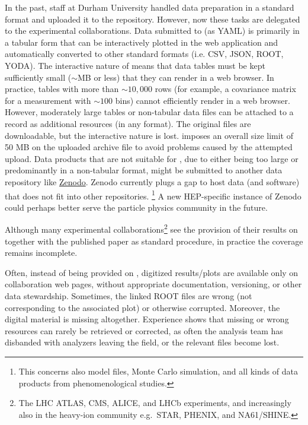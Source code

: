 \documentclass[11pt]{article}
\begin{document}
In the past, \hepdata staff at Durham University handled data preparation in a standard format and uploaded it to the repository.
However, now these tasks are delegated to the experimental collaborations.
Data submitted to \hepdata (as YAML) is primarily in a tabular form that can be interactively plotted in the web application and automatically converted to other standard formats (i.e. CSV, JSON, ROOT, YODA).
The interactive nature of \hepdata means that data tables must be kept sufficiently small ($\sim$MB or less) that they can render in a web browser.
In practice, tables with more than $\sim 10,000$ rows (for example, a covariance matrix for a measurement with $\sim 100$ bins) cannot efficiently render in a web browser.
However, moderately large tables or non-tabular data files can be attached to a \hepdata record as additional resources (in any format).
The original files are downloadable, but the interactive nature is lost.
\hepdata imposes an overall size limit of 50 MB on the uploaded archive file to avoid problems caused by the attempted upload. 
%
Data products that are not suitable for \hepdata, due to either being too large or predominantly in a non-tabular format, might be submitted to another data repository like \href{https://zenodo.org/}{Zenodo}.
Zenodo currently plugs a gap to host data (and software) that does not fit into other repositories.%
\footnote{This concerns also model files, Monte Carlo simulation, and all kinds of data products from phenomenological studies.}
A new HEP-specific instance of Zenodo could perhaps better serve the particle physics community in the future.


Although many experimental collaborations\footnote{The LHC ATLAS, CMS, ALICE, and LHCb experiments, and increasingly also in the heavy-ion community e.g.~STAR, PHENIX, and NA61/SHINE.} see the provision of their results on \hepdata together with the published paper as standard procedure, in practice the coverage remains incomplete.

Often, instead of being provided on \hepdata, digitized results/plots are available only on collaboration web pages, without appropriate documentation, versioning, or other data stewardship.
Sometimes, the linked ROOT files are wrong (not corresponding to the associated plot) or otherwise corrupted.
Moreover, the digital material is missing altogether.
Experience shows that missing or wrong resources can rarely be retrieved or corrected, as often the analysis team has disbanded with analyzers leaving the field, or the relevant files become lost. 
\end{document}
